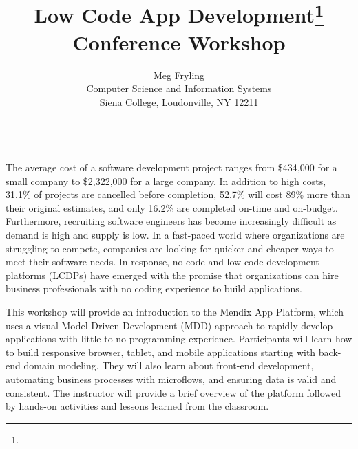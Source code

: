 \documentclass{article}
\title{Low Code App Development\footnote{\protect}
\\
\vspace{0.2in}
\large{
Conference Workshop
}}
\author{
Meg Fryling\\
Computer Science and Information Systems\\
Siena College, Loudonville, NY 12211\\
\email{mfryling@siena.edu}\\
}
\begin{document}
\maketitle

The average cost of a software development project ranges from \$434,000 for a small company to \$2,322,000 for a large company\cite{standish}.  In addition to high costs, 31.1\% of projects are cancelled before completion, 52.7\% will cost 89\% more than their original estimates, and only 16.2\% are completed on-time and on-budget\cite{standish}. Furthermore, recruiting software engineers has become increasingly difficult as demand is high and supply is low\cite{torres}.  In a fast-paced world where organizations are struggling to compete, companies are looking for quicker and cheaper ways to meet their software needs.  In response, no-code and low-code development platforms (LCDPs) have emerged with the promise that organizations can hire business professionals with no coding experience to build applications\cite{rayome}.

This workshop will provide an introduction to the Mendix App Platform, which uses a visual Model-Driven Development (MDD) approach to rapidly develop applications with little-to-no programming experience. Participants will learn how to build responsive browser, tablet, and mobile applications starting with back-end domain modeling. They will also learn about front-end development, automating business processes with microflows, and ensuring data is valid and consistent. The instructor will provide a brief overview of the platform followed by hands-on activities and lessons learned from the classroom.


\small{

}
\end{document}
